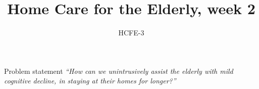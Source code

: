 \documentclass{beamer}
\title[]{Home Care for the Elderly, week 2}
\institute[]{Delft University of Technology, The Netherlands}
\author{HCFE-3}
\begin{document}
{
\frame{\titlepage}
}

{

}




\begin{frame}{Problem statement}
\textit{\Large{``How can we unintrusively assist the elderly with mild cognitive decline, in staying at their homes for longer?''}}

\end{frame}






\end{document}
